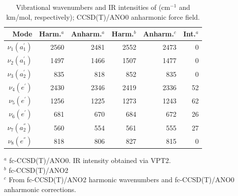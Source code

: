 \begin{table}[ht]
  \caption{Vibrational wavenumbers and IR intensities of \cycD (cm$^{-1}$ and km/mol, respectively); CCSD(T)/ANO0 anharmonic force field.}
    \begin{center}
    \begin{tabular}{rrrrrr} \hline
    
        Mode & Harm.$^a$ & Anharm.$^a$ & Harm.$^b$ & Anharm.$^c$ & Int.$^a$\\ \hline
        $\nu_{1}(a^{'}_1)$ & 2560 & 2481 & 2552 & 2473 & 0  \\ %
        $\nu_{2}(a^{'}_1)$ & 1497 & 1466 & 1507 & 1477 & 0  \\ %
        $\nu_{3}(a^{'}_2)$ &  835 &  818 &  852 &  835 & 0  \\ %
        $\nu_{4}(e^{'})$   & 2430 & 2346 & 2419 & 2336 & 52  \\ %
        $\nu_{5}(e^{'})$   & 1256 & 1225 & 1273 & 1243 & 62  \\ %
        $\nu_{6}(e^{'})$   &  681 &  670 &  684 &  672 & 26  \\ %
        $\nu_{7}(a^{''}_2)$&  560 &  554 &  561 &  555 & 27  \\ %
        $\nu_{8}(e^{''})$  &  818 &  806 &  827 &  815 & 0  \\ %
                \bottomrule
        \hline
    \end{tabular}
    \end{center}
    $^a$ fc-CCSD(T)/ANO0. IR intensity obtained via VPT2.\\
    $^b$ fc-CCSD(T)/ANO2\\
    $^c$ From fc-CCSD(T)/ANO2 harmonic wavenumbers and fc-CCSD(T)/ANO0 anharmonic corrections.
\end{table}

